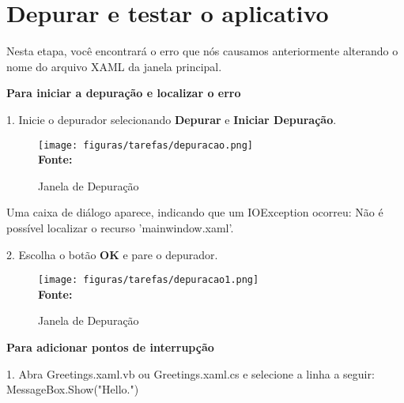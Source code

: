 \section{Depurar e testar o aplicativo}

Nesta etapa, você encontrará o erro que nós causamos anteriormente alterando o nome do arquivo XAML da janela principal. 

\textbf{Para iniciar a depuração e localizar o erro}

1. Inicie o depurador selecionando \textbf{Depurar} e \textbf{Iniciar Depuração}.

\begin{figure}[ht!]
	\centering	
	\caption[\hspace{-0.1cm} Janela de Depuração]{Janela de Depuração}
	\vspace{-0.4cm}
	\texttt{[image: figuras/tarefas/depuracao.png]}
	\vspace{-0.2cm}
	\\\textbf{\footnotesize Fonte:~\cite {tutorial_visual:14} }
	\label{fig:janeladepuracao}
	\vspace{-0.5cm}
\end{figure}

\newpage
Uma caixa de diálogo aparece, indicando que um IOException ocorreu: Não é possível localizar o recurso 'mainwindow.xaml'.

2. Escolha o botão \textbf{OK} e pare o depurador. 

\begin{figure}[ht!]
	\centering	
	\caption[\hspace{-0.1cm} Janela de Depuração]{Janela de Depuração}
	\vspace{-0.4cm}
	\texttt{[image: figuras/tarefas/depuracao1.png]}
	\vspace{-0.2cm}
	\\\textbf{\footnotesize Fonte:~\cite {tutorial_visual:14} }
	\label{fig:janeladepuracao1}
	\vspace{-0.5cm}
\end{figure}

\textbf{Para adicionar pontos de interrupção}


1. Abra Greetings.xaml.vb ou Greetings.xaml.cs e selecione a linha a seguir: MessageBox.Show("Hello.")

